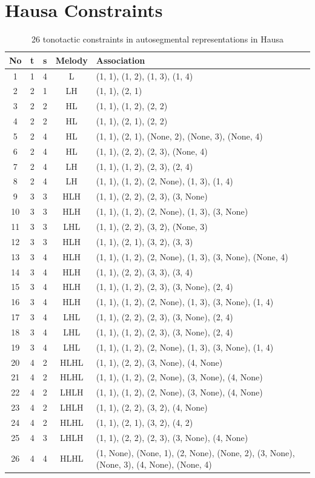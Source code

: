 \documentclass[11pt,letterpaper]{article}
\begin{document}
\section{Hausa Constraints}
\begin{table}[H]
	\centering
	\begin{tabular}{ccccl}
		\hline
		No & t & s & Melody & Association \\
		\hline
1	&	1 & 4 & L & (1, 1), (1, 2), (1, 3), (1, 4) \\
2	&	2 & 1 & LH & (1, 1), (2, 1) \\
3	&	2 & 2 & HL & (1, 1), (1, 2), (2, 2) \\
4	&	2 & 2 & HL & (1, 1), (2, 1), (2, 2) \\
5	&	2 & 4 & HL & (1, 1), (2, 1), (None, 2), (None, 3), (None, 4) \\
6	&	2 & 4 & HL & (1, 1), (2, 2), (2, 3), (None, 4) \\
7	&	2 & 4 & LH & (1, 1), (1, 2), (2, 3), (2, 4) \\
8	&	2 & 4 & LH & (1, 1), (1, 2), (2, None), (1, 3), (1, 4) \\
9	&	3 & 3 & HLH & (1, 1), (2, 2), (2, 3), (3, None) \\
10	&	3 & 3 & HLH & (1, 1), (1, 2), (2, None), (1, 3), (3, None) \\
11	&	3 & 3 & LHL & (1, 1), (2, 2), (3, 2), (None, 3) \\
12	&	3 & 3 & HLH & (1, 1), (2, 1), (3, 2), (3, 3) \\
13	&	3 & 4 & HLH & (1, 1), (1, 2), (2, None), (1, 3), (3, None), (None, 4) \\
14	&	3 & 4 & HLH & (1, 1), (2, 2), (3, 3), (3, 4) \\
15	&	3 & 4 & HLH & (1, 1), (1, 2), (2, 3), (3, None), (2, 4) \\
16	&	3 & 4 & HLH & (1, 1), (1, 2), (2, None), (1, 3), (3, None), (1, 4) \\
17	&	3 & 4 & LHL & (1, 1), (2, 2), (2, 3), (3, None), (2, 4) \\
18	&	3 & 4 & LHL & (1, 1), (1, 2), (2, 3), (3, None), (2, 4) \\
19	&	3 & 4 & LHL & (1, 1), (1, 2), (2, None), (1, 3), (3, None), (1, 4) \\
20	&	4 & 2 & HLHL & (1, 1), (2, 2), (3, None), (4, None) \\
21	&	4 & 2 & HLHL & (1, 1), (1, 2), (2, None), (3, None), (4, None) \\
22	&	4 & 2 & LHLH & (1, 1), (1, 2), (2, None), (3, None), (4, None) \\
23	&	4 & 2 & LHLH & (1, 1), (2, 2), (3, 2), (4, None) \\
24	&	4 & 2 & HLHL & (1, 1), (2, 1), (3, 2), (4, 2) \\
25	&	4 & 3 & LHLH & (1, 1), (2, 2), (2, 3), (3, None), (4, None) \\
26	&	4 & 4 & HLHL & (1, None), (None, 1), (2, None), (None, 2), (3, None), (None, 3), (4, None), (None, 4) \\
		\hline
	\end{tabular}
	\caption{26 tonotactic constraints in autosegmental representations in Hausa}
	\label{tab:hausaar}
\end{table}
\end{document}
